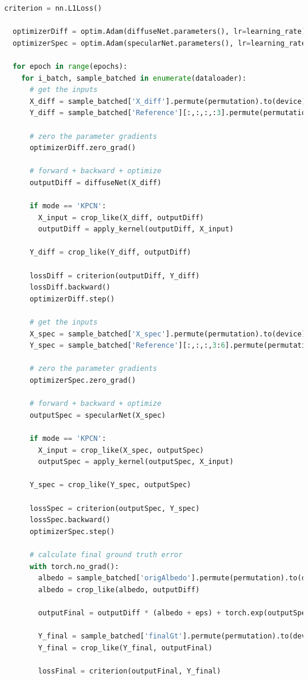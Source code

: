\documentclass[times, utf8, seminar, numeric]{fer}
\begin{document}
\begin{lstlisting}[language=Python,
    basicstyle=\tiny,
    caption=Kostur postupka učenja podmreža.]
  criterion = nn.L1Loss()

  optimizerDiff = optim.Adam(diffuseNet.parameters(), lr=learning_rate)
  optimizerSpec = optim.Adam(specularNet.parameters(), lr=learning_rate)

  for epoch in range(epochs):
    for i_batch, sample_batched in enumerate(dataloader):
      # get the inputs
      X_diff = sample_batched['X_diff'].permute(permutation).to(device)
      Y_diff = sample_batched['Reference'][:,:,:,:3].permute(permutation).to(device)

      # zero the parameter gradients
      optimizerDiff.zero_grad()

      # forward + backward + optimize
      outputDiff = diffuseNet(X_diff)

      if mode == 'KPCN':
        X_input = crop_like(X_diff, outputDiff)
        outputDiff = apply_kernel(outputDiff, X_input)

      Y_diff = crop_like(Y_diff, outputDiff)

      lossDiff = criterion(outputDiff, Y_diff)
      lossDiff.backward()
      optimizerDiff.step()

      # get the inputs
      X_spec = sample_batched['X_spec'].permute(permutation).to(device)
      Y_spec = sample_batched['Reference'][:,:,:,3:6].permute(permutation).to(device)

      # zero the parameter gradients
      optimizerSpec.zero_grad()

      # forward + backward + optimize
      outputSpec = specularNet(X_spec)

      if mode == 'KPCN':
        X_input = crop_like(X_spec, outputSpec)
        outputSpec = apply_kernel(outputSpec, X_input)

      Y_spec = crop_like(Y_spec, outputSpec)

      lossSpec = criterion(outputSpec, Y_spec)
      lossSpec.backward()
      optimizerSpec.step()

      # calculate final ground truth error
      with torch.no_grad():
        albedo = sample_batched['origAlbedo'].permute(permutation).to(device)
        albedo = crop_like(albedo, outputDiff)

        outputFinal = outputDiff * (albedo + eps) + torch.exp(outputSpec) - 1.0

        Y_final = sample_batched['finalGt'].permute(permutation).to(device)
        Y_final = crop_like(Y_final, outputFinal)

        lossFinal = criterion(outputFinal, Y_final)
\end{lstlisting}



\end{document}
